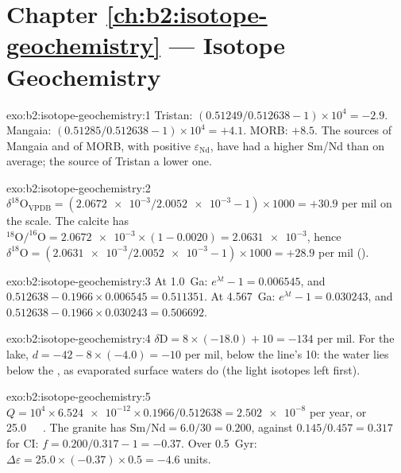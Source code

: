 \section*{Chapter \ref{ch:b2:isotope-geochemistry} --- Isotope Geochemistry}

\begin{solution}{exo:b2:isotope-geochemistry:1}
Tristan: $(0.51249/0.512638 - 1)\times10^4 = -2.9$. Mangaia: $(0.51285/0.512638 -
1)\times10^4 = +4.1$. MORB: $+8.5$. The sources of Mangaia and of MORB, with positive
$\varepsilon_{\mathrm{Nd}}$, have had a higher Sm/Nd than  on average; the
source of Tristan a lower one.
\end{solution}

\begin{solution}{exo:b2:isotope-geochemistry:2}
$\delta^{18}\mathrm{O}_{\mathrm{VPDB}} = (\num{2.0672e-3}/\num{2.0052e-3} - 1)\times1000 =
+30.9$ per mil on the  scale. The calcite has $^{18}\mathrm{O}/^{16}\mathrm{O} =
\num{2.0672e-3}\times(1 - 0.0020) = \num{2.0631e-3}$, hence $\delta^{18}\mathrm{O} =
(\num{2.0631e-3}/\num{2.0052e-3} - 1)\times1000 = +28.9$ per mil ().
\end{solution}

\begin{solution}{exo:b2:isotope-geochemistry:3}
At \qty{1.0}{Ga}: $e^{\lambda t} - 1 = 0.006545$, and $0.512638 - 0.1966\times0.006545 =
0.511351$. At \qty{4.567}{Ga}: $e^{\lambda t}-1 = 0.030243$, and $0.512638 -
0.1966\times0.030243 = 0.506692$.
\end{solution}

\begin{solution}{exo:b2:isotope-geochemistry:4}
$\delta\mathrm{D} = 8\times(-18.0) + 10 = -134$ per mil. For the lake, $d = -42 -
8\times(-4.0) = -10$ per mil, below the line's 10: the water lies below the , as evaporated surface waters do (the light isotopes left first).
\end{solution}

\begin{solution}{exo:b2:isotope-geochemistry:5}
$Q = 10^4\times\num{6.524e-12}\times0.1966/0.512638 = \num{2.502e-8}$ per year, or
\qty{25.0}{\per\giga\year}. The granite has $\mathrm{Sm}/\mathrm{Nd} = 6.0/30 = 0.200$,
against $0.145/0.457 = 0.317$ for CI: $f = 0.200/0.317 - 1 = -0.37$. Over
\qty{0.5}{Gyr}: $\Delta\varepsilon = 25.0\times(-0.37)\times0.5 = -4.6$ units.
\end{solution}

